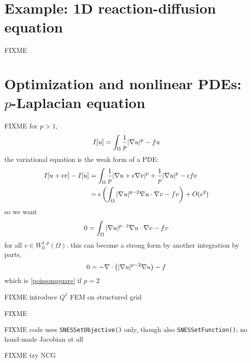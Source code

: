 \section{Example: 1D reaction-diffusion equation}

FIXME

\vfill
{}




\section{Optimization and nonlinear PDEs: $p$-Laplacian equation}

FIXME for $p>1$,
    $$I[u] = \int_\Omega \frac{1}{p} |\nabla u|^p - fu$$
the variational equation is the weak form of a PDE:
\begin{align*}
I[u+\epsilon v] - I[u] &= \int_\Omega \frac{1}{p} |\nabla u + \epsilon \nabla v|^p + \frac{1}{p} |\nabla u|^p - \epsilon f v \\
   &= \epsilon \left(\int_\Omega |\nabla u|^{p-2} \nabla u \cdot \nabla v - f v\right) + O(\epsilon^2)
\end{align*}
so we want
    $$0 = \int_\Omega |\nabla u|^{p-2} \nabla u \cdot \nabla v - f v$$
for all $v \in W^{1,p}_0(\Omega)$.  this can become a strong form by another integration by parts,
    $$0 = - \nabla\cdot\left(|\nabla u|^{p-2} \nabla u\right) - f$$
which is \eqref{poissonsquare} if $p=2$

FIXME introduce $Q^1$ FEM on structured grid

\begin{marginfigure}

\caption{FIXME}
\label{fig:q1hat}
\end{marginfigure}

FIXME code uses \texttt{SNESSetObjective()} only, though also \texttt{SNESSetFunction()}; no hand-made Jacobian at all

FIXME try NCG
